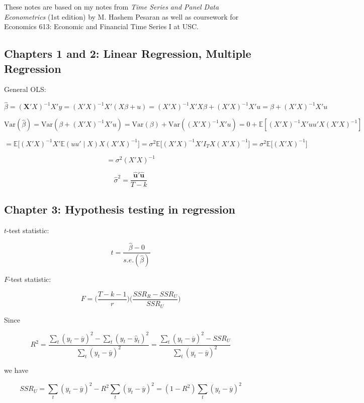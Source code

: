 \documentclass{article}
\newcommand{\E}{\mathbb{E}}
\newcommand{\Var}{\mathrm{Var}}
\begin{document}
These notes are based on my notes from \textit{Time Series and Panel Data Econometrics} (1st edition) by M. Hashem Pesaran as well as coursework for Economics 613: Economic and Financial Time Series I at USC.


\subsection{Chapters 1 and 2: Linear Regression, Multiple Regression}

General OLS:

\[
\hat{\beta} = (\boldsymbol{X}'X)^{-1}X'y = (X'X)^{-1}X'(X\beta + u) = (X'X)^{-1}X'X\beta + (X'X)^{-1}X'u  = \beta + (X'X)^{-1}X'u
\]

\[
\Var(\hat{\beta}) = \Var(\beta + (X'X)^{-1}X'u) = \Var(\beta) + \Var((X'X)^{-1}X' u) = 0 + \E[(X'X)^{-1}X' uu' X (X'X)^{-1} ] 
\]

\[
=\E \big[ (X'X)^{-1}X' \E(uu' \mid X)X(X'X)^{-1} \big] = \sigma^2 \E \big[ (X'X)^{-1}X' I_T X(X'X)^{-1} \big] = \sigma^2 \E \big[ (X'X)^{-1} \big]
\]

\[
= \sigma^2  (X'X)^{-1} 
\]

\[
\hat{\sigma}^2 = \frac{ \hat{\boldsymbol{u}}'  \hat{\boldsymbol{u}}}{T - k}
\]

\subsection{Chapter 3: Hypothesis testing in regression}

\(t\)-test statistic:

\[
t = \frac{\hat{\beta} - 0}{s.e.(\hat{\beta})}
\]

\(F\)-test statistic:

\[
F = \bigg( \frac{T - k - 1}{r}\bigg) \bigg( \frac{SSR_R - SSR_U} {SSR_U} \bigg)
\]

Since 

\[
R^2 = \frac{ \sum_t(y_t - \overline{y})^2 - \sum_t(y_t - \hat{y}_t)^2}{ \sum_t(y_t - \overline{y})^2} =  \frac{ \sum_t(y_t - \overline{y})^2 - SSR_U}{ \sum_t(y_t - \overline{y})^2} 
\]

we have

\[
SSR_U =  \sum_t(y_t - \overline{y})^2 - R^2  \sum_t(y_t - \overline{y})^2  =  (1 - R^2)\sum_t(y_t - \overline{y})^2
\]
\end{document}

